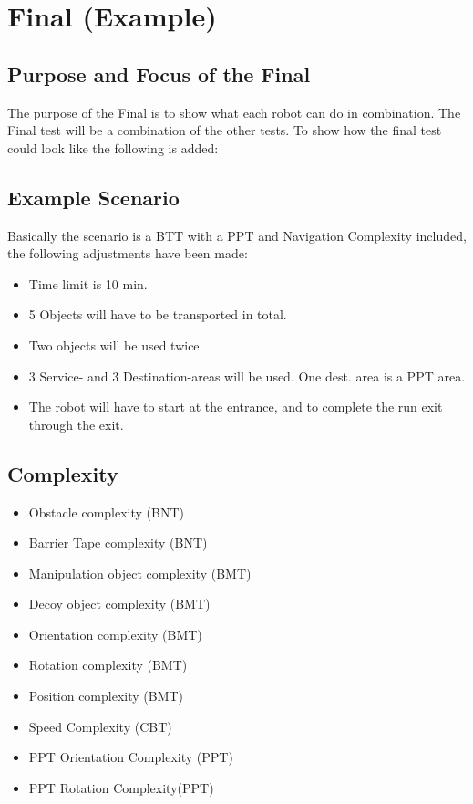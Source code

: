 \section{Final (Example)}

\subsection{Purpose and Focus of the Final}
The purpose of the Final is to show what each robot can do in combination. The Final test will be a combination of the other tests. To show how the final test could look like the following is added:

\subsection{Example Scenario}

Basically the scenario is a BTT with a PPT and Navigation Complexity included, the following adjustments have been made:

\begin{itemize}
\item Time limit is 10 min. 
\item 5 Objects will have to be transported in total. 
\item Two objects will be used twice. 
\item 3 Service- and 3 Destination-areas will be used. One dest. area is a PPT area.
\item The robot will have to start at the entrance, and to complete the run exit through the exit.  
\end{itemize}


\subsection{Complexity}
	
\begin{itemize}
\item Obstacle complexity (BNT)
\item Barrier Tape complexity (BNT)
\item Manipulation object complexity (BMT)
\item Decoy object complexity (BMT)
\item Orientation complexity (BMT)
\item Rotation complexity (BMT)
\item Position complexity (BMT)
\item Speed Complexity (CBT)
\item PPT Orientation Complexity (PPT)
\item PPT Rotation Complexity(PPT)
\end{itemize}

